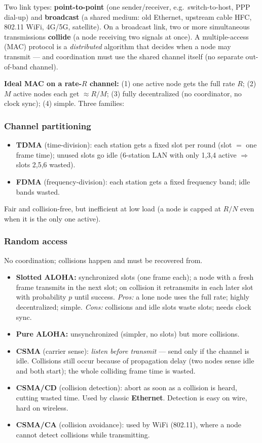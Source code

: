 \documentclass[hidelinks]{article}
\begin{document}
Two link types: \textbf{point-to-point} (one sender/receiver, e.g.\
switch-to-host, PPP dial-up) and \textbf{broadcast} (a shared medium: old
Ethernet, upstream cable HFC, 802.11 WiFi, 4G/5G, satellite). On a broadcast
link, two or more simultaneous transmissions \textbf{collide} (a node receiving
two signals at once). A multiple-access (MAC) protocol is a \emph{distributed}
algorithm that decides when a node may transmit --- and coordination must use
the shared channel itself (no separate out-of-band channel).

\textbf{Ideal MAC on a rate-$R$ channel:} (1) one active node gets the full
rate $R$; (2) $M$ active nodes each get $\approx R/M$; (3) fully decentralized
(no coordinator, no clock sync); (4) simple. Three families:

\subsubsection{Channel partitioning}
\begin{itemize}
    \item \textbf{TDMA} (time-division): each station gets a fixed slot per
    round (slot $=$ one frame time); unused slots go idle (6-station LAN with
    only 1,3,4 active $\Rightarrow$ slots 2,5,6 wasted).
    \item \textbf{FDMA} (frequency-division): each station gets a fixed
    frequency band; idle bands wasted.
\end{itemize}
Fair and collision-free, but inefficient at low load (a node is capped at
$R/N$ even when it is the only one active).

\subsubsection{Random access}
No coordination; collisions happen and must be recovered from.
\begin{itemize}
    \item \textbf{Slotted ALOHA:} synchronized slots (one frame each); a node
    with a fresh frame transmits in the next slot; on collision it retransmits
    in each later slot with probability $p$ until success. \emph{Pros:} a lone
    node uses the full rate; highly decentralized; simple. \emph{Cons:}
    collisions and idle slots waste slots; needs clock sync.
    \item \textbf{Pure ALOHA:} unsynchronized (simpler, no slots) but more
    collisions.
    \item \textbf{CSMA} (carrier sense): \emph{listen before transmit} --- send
    only if the channel is idle. Collisions still occur because of propagation
    delay (two nodes sense idle and both start); the whole colliding frame time
    is wasted.
    \item \textbf{CSMA/CD} (collision detection): abort as soon as a collision
    is heard, cutting wasted time. Used by classic \textbf{Ethernet}. Detection
    is easy on wire, hard on wireless.
    \item \textbf{CSMA/CA} (collision avoidance): used by WiFi (802.11), where
    a node cannot detect collisions while transmitting.
\end{itemize}
\end{document}
